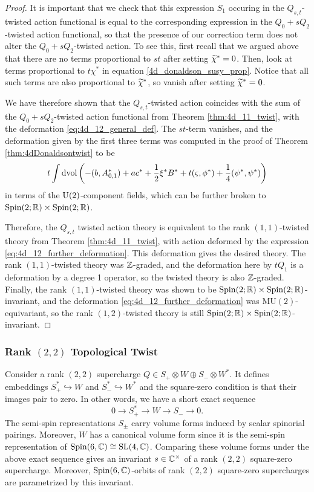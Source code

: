 \documentclass[10pt, oneside]{article}
\newcommand{\MU}{\mathrm{MU}}
\begin{document}
\begin{proof}
It is important that we check that this expression $S_1$ occuring in the $Q_{s,t}$-twisted action functional is equal to the corresponding expression in the $Q_0 + sQ_2$-twisted action functional, so that the presence of our correction term does not alter the $Q_0 + sQ_2$-twisted action.  To see this, first recall that we argued above that there are no terms proportional to $st$ after setting $\widetilde{\chi}^* = 0$.  Then, look at terms proportional to $t \chi^*$ in equation \ref{4d_donaldson_susy_prop}.  Notice that all such terms are also proportional to $\widetilde{\chi}^*$, so vanish after setting $\widetilde{\chi}^* = 0$.

We have therefore shown that the $Q_{s,t}$-twisted action coincides with the sum of the $Q_0 + sQ_2$-twisted action functional from Theorem \ref{thm:4d_11_twist}, with the deformation \ref{eq:4d_12_general_def}.  The $st$-term vanishes, and the deformation given by the first three terms was computed in the proof of Theorem \ref{thm:4dDonaldsontwist} to be
\begin{equation}
\label{eq:4d_12_further_deformation}
t \int\operatorname{dvol}\left(-(b, A_{0, 1}^*) + a c^* + \frac{1}{2} \xi^* B^* + t (\varsigma, \phi^*) + \frac 14 (\psi^*, \psi^*) \right)
\end{equation}
in terms of the $\mathrm{U}(2)$-component fields, which can be further broken to $\mathrm{Spin}(2;\mathbb R) \times \mathrm{Spin}(2;\mathbb R)$.

Therefore, the $Q_{s,t}$ twisted action theory is equivalent to the rank $(1,1)$-twisted theory from Theorem \ref{thm:4d_11_twist}, with action deformed by the expression \ref{eq:4d_12_further_deformation}.  This deformation gives the desired theory.  The rank $(1,1)$-twisted theory was $\mathbb Z$-graded, and the deformation here by $tQ_1$ is a deformation by a degree 1 operator, so the twisted theory is also $\mathbb Z$-graded.  Finally, the rank $(1,1)$-twisted theory was shown to be $\mathrm{Spin}(2;\mathbb R) \times \mathrm{Spin}(2;\mathbb R)$-invariant, and the deformation \ref{eq:4d_12_further_deformation} was $\MU(2)$-equivariant, so the rank $(1,2)$-twisted theory is still $\mathrm{Spin}(2;\mathbb R) \times \mathrm{Spin}(2;\mathbb R)$-invariant.
\end{proof}

\subsubsection{Rank \texorpdfstring{$(2, 2)$}{(2,2)} Topological Twist}
\label{sect:4dqgltwist}

Consider a rank $(2, 2)$ supercharge $Q\in S_+\otimes W\oplus S_-\otimes W^*$. It defines embeddings $S_+^*\hookrightarrow W$ and $S_-^*\hookrightarrow W^*$ and the square-zero condition is that their images pair to zero. In other words, we have a short exact sequence
\[0\longrightarrow S_+^*\longrightarrow W\longrightarrow S_-\longrightarrow 0.\]
The semi-spin representations $S_\pm$ carry volume forms induced by scalar spinorial pairings. Moreover, $W$ has a canonical volume form since it is the semi-spin representation of $\mathrm{Spin}(6, \mathbb C)\cong \mathrm{SL}(4, \mathbb C)$. Comparing these volume forms under the above exact sequence gives an invariant $s\in\mathbb C^\times$ of a rank $(2, 2)$ square-zero supercharge. Moreover, $\mathrm{Spin}(6, \mathbb C)$-orbits of rank $(2, 2)$ square-zero supercharges are parametrized by this invariant.
\end{document}
